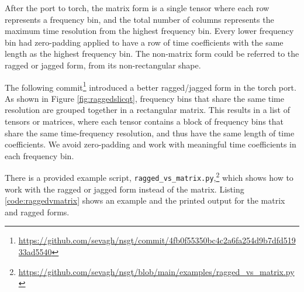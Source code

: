 \documentclass[report.tex]{subfiles}
\begin{document}
After the port to torch, the matrix form is a single tensor where each row represents a frequency bin, and the total number of columns represents the maximum time resolution from the highest frequency bin. Every lower frequency bin had zero-padding applied to have a row of time coefficients with the same length as the highest frequency bin. The non-matrix form could be referred to the ragged or jagged form, from its non-rectangular shape.

The following commit\footnote{\url{https://github.com/sevagh/nsgt/commit/4fb0f55350bc4c2a6fa254d9b7dfd51933ad5540}} introduced a better ragged/jagged form in the torch port. As shown in Figure \ref{fig:raggedslicqt}, frequency bins that share the same time resolution are grouped together in a rectangular matrix. This results in a list of tensors or matrices, where each tensor contains a block of frequency bins that share the same time-frequency resolution, and thus have the same length of time coefficients. We avoid zero-padding and work with meaningful time coefficients in each frequency bin.

There is a provided example script, \Verb#ragged_vs_matrix.py#,\footnote{\url{https://github.com/sevagh/nsgt/blob/main/examples/ragged_vs_matrix.py}} which shows how to work with the ragged or jagged form instead of the matrix. Listing \ref{code:raggedvmatrix} shows an example and the printed output for the matrix and ragged forms.
\end{document}
